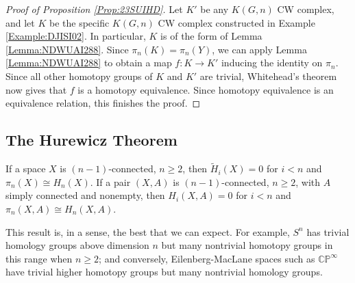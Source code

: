 \begin{proof}[Proof of Proposition \ref{Prop:23SUIHD}]
    Let $K'$ be any $K\left( G,n \right) $ CW complex, and
    let $K$ be the specific $K(G,n)$ CW complex constructed
    in Example \ref{Example:DJISI02}. In particular,
    $K$ is of the form of 
    Lemma \ref{Lemma:NDWUAI288}. Since
    $\pi_n(K) = \pi_n(Y)$, we can apply Lemma
    \ref{Lemma:NDWUAI288} to obtain a map
    $f \colon K \to K'$ inducing the identity
    on $\pi_n$. Since all other homotopy groups
    of $K$ and $K'$ are trivial, Whitehead's theorem now gives
    that $f$ is a homotopy equivalence. Since
    homotopy equivalence is an equivalence relation, this finishes
    the proof.
\end{proof}


\subsection{The Hurewicz Theorem}

\begin{theorem}\label{Theorem:Little-Hurewicz}
    If a space $X$ is $(n-1)$-connected, $n\ge 2$,
    then $\tilde{H}_i (X) = 0$ for 
    $i < n$ and $\pi_n (X) \cong
    H_n (X)$. If a pair $(X,A)$ is $(n-1)$-connected,
    $n \ge 2$, with $A$ simply connected
    and nonempty, then $H_i (X,A) = 0$ for
    $i < n$ and $\pi_n (X,A) \cong
    H_n (X,A)$.
\end{theorem}

\begin{remark}[]
    This result is, in a sense, the best that we can
    expect. For example, $S^{n}$ has trivial
    homology groups above dimension $n$ but many
    nontrivial homotopy groups in this range
    when $n\ge 2$; and conversely,
    Eilenberg-MacLane spaces such as
    $\mathbb{C}\mathbb{P}^{\infty}$ have trivial
    higher homotopy groups but many nontrivial homology
    groups.
\end{remark}

